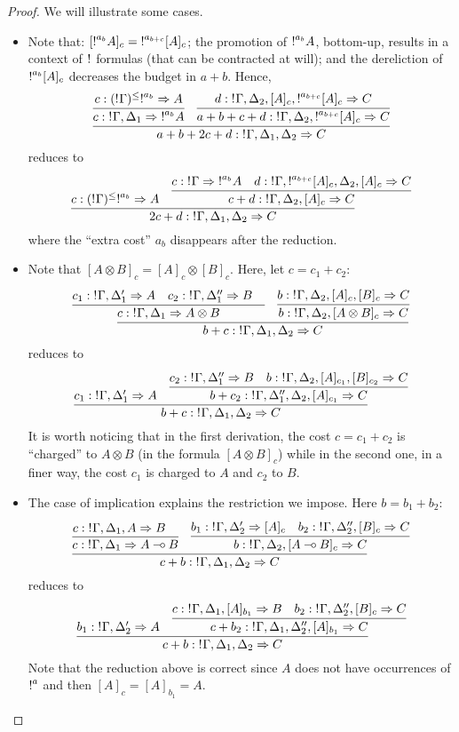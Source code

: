 \begin{proof}
We will illustrate some cases. 
\begin{itemize}
 \item Note that: $[\hbox{$\mathop{!}^{a_b}$}A]_c = \hbox{$\mathop{!}^{a_{b+c}}$}[A]_c$;  the promotion of $\hbox{$\mathop{!}^{a_b}$}A$, bottom-up, results in a context of 
 $\hbox{$\mathop{!}^{}$}$ formulas (that can be contracted at will);
 and   the dereliction of $\hbox{$\mathop{!}^{a_b}$}[A]_c$ decreases the budget in $a + b$. Hence, 
  $$
 \infer{a + b + 2c+d: \nbang{}\Gamma,\Delta_1,\Delta_2 \seq C}{
   \infer{c: \nbang{}\Gamma,\Delta_1 \seq \nbang{a_b}A}{c: (\nbang{}\Gamma)^\leqn{a_b}\seq A}&
   \infer{a+b+c+d: \nbang{}\Gamma, \Delta_2, \nbang{a_{b+c}}[A]_c \seq C}{d: \nbang{}\Gamma, \Delta_2, [A]_{c}, \nbang{a_{b+c}}[A]_c \seq C}
 }
 $$
reduces to
$$
   \infer{2c+d: \nbang{}\Gamma,\Delta_1,\Delta_2 \seq C}{
    \deduce{c: (\nbang{}\Gamma)^\leqn{a_b} \seq A}{} &
     \infer{c+d: \nbang{}\Gamma,\Delta_2, [A]_{c}\seq C}{
      \deduce{c:\nbang{}\Gamma \seq \nbang{a_b}A}{}&
      \deduce{d:\nbang{}\Gamma,\nbang{a_{b+c}}[A]_c, \Delta_2, [A]_{c}\seq C}{}
     }
    }
 $$
where the  ``extra cost'' $a_b$ disappears after the reduction. 
 \item Note that $[A\otimes B]_c = [A]_{c} \otimes [B]_c$. Here, let $c = c_1 + c_2$: 
 \[
 \infer{b+c: \nbang{}\Gamma,\Delta_1,\Delta_2 \seq C}{
  \infer{c:\nbang{}\Gamma,\Delta_1 \seq A \otimes B}{
   \deduce{c_1: \nbang{}\Gamma,\Delta_1' \seq A}{} &
   \deduce{c_2:\nbang{}\Gamma,\Delta_1'' \seq B}{} &
  } &
  \infer{b: \nbang{}\Gamma,\Delta_2, [A \otimes B]_{c} \seq C}{b: \nbang{}\Gamma,\Delta_2, [A]_c, [B]_c \seq C}
 }
 \]
 reduces to
\[
 \infer{b+c: \nbang{}\Gamma,\Delta_1,\Delta_2 \seq C}{
  \deduce{c_1: \nbang{}\Gamma,\Delta_1' \seq A}{} &
  \infer{b+c_2: \nbang{}\Gamma,\Delta_1 '',\Delta_2, [A]_{c_1} \seq C}{
   \deduce{c_2: \nbang{}\Gamma,\Delta_1'' \seq B}{} &
   \deduce{b: \nbang{}\Gamma,\Delta_2,[A]_{c_1}, [B]_{c_2} \seq C}{}
  }
 }
 \]
 It is worth noticing that in the first derivation, the cost $c=c_1 + c_2$ is ``charged'' to  $A\otimes B$ 
(in the formula $[A \otimes B]_c$)
while in the second one, in a  finer way, the cost $c_1$ is charged to $A$ and $c_2$ to $B$. 
 \item The case of implication explains the restriction we impose. Here $b = b_1 + b_2$:
 $$
\infer{c+b: \nbang{}\Gamma,\Delta_1,\Delta_2 \seq C }{
  \infer{c: \nbang{}\Gamma,\Delta_1 \seq A\limp B}{
   \deduce{c: \nbang{}\Gamma,\Delta_1,A  \seq B}{}&
   }&
   \infer{b: \nbang{}\Gamma,\Delta_2, [A \limp B]_c \seq C }{
     \deduce{b_1: \nbang{}\Gamma,\Delta_2' \seq [A]_{c}}{}&
     \deduce{b_2: \nbang{}\Gamma,\Delta_2'', [B]_c\seq C}{}
   }
}
 $$
 reduces to 
 \[
 \infer{c+b: \nbang{}\Gamma,\Delta_1,\Delta_2 \seq C}{
   \deduce{b_1: \nbang{}\Gamma,\Delta_2' \seq A}{}&
   \infer{c+b_2: \nbang{}\Gamma,\Delta_1,\Delta_2'', [A]_{b_1} \seq C}{
    \deduce{c: \nbang{}\Gamma,\Delta_1, [A]_{b_1} \seq B}{} &
    \deduce{b_2: \nbang{}\Gamma,\Delta_2'', [B]_{c} \seq C}{}
   }
 }
 \]
Note that the reduction above is correct since $A$ does not have 
occurrences of $\hbox{$\mathop{!}^{a}$}$ and then  $[A]_c = [A]_{b_1}=A$. 
\end{itemize}
\end{proof}


